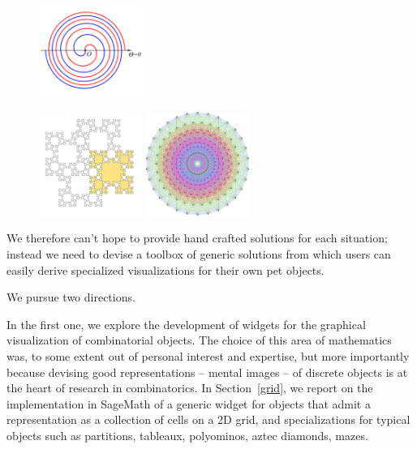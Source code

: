 \documentclass{deliverablereport}
\begin{document}
\begin{figure}[h]
\begin{center}
    \hspace{4px}
  \includegraphics[width=0.3\textwidth]{images/548px-Fermat's_spiral_01}
\end{center}\end{figure}\begin{figure}[h]\begin{center}
  \includegraphics[width=0.3\textwidth]{images/619px-Tiling_Fibonacci_word_fractal}
    \hspace{32px}
\includegraphics[width=0.3\textwidth]{images/597px-E8Petrie}
\end{center}\end{figure}


\newpage

We therefore can't hope to provide hand crafted solutions for each
situation; instead we need to devise a toolbox of generic solutions
from which users can easily derive specialized visualizations for
their own pet objects.

We pursue two directions.

In the first one, we explore the development of widgets for the
graphical visualization of combinatorial objects.
The choice of this area of mathematics was, to some extent
out of personal interest and expertise, but more importantly because
devising good representations -- mental images -- of discrete objects
is at the heart of research in combinatorics. In Section~\ref{grid},
we report on the implementation in SageMath of a generic widget for
objects that admit a representation as a collection of cells on a 2D
grid, and specializations for typical objects such as partitions,
tableaux, polyominos, aztec diamonds, mazes.
\end{document}
